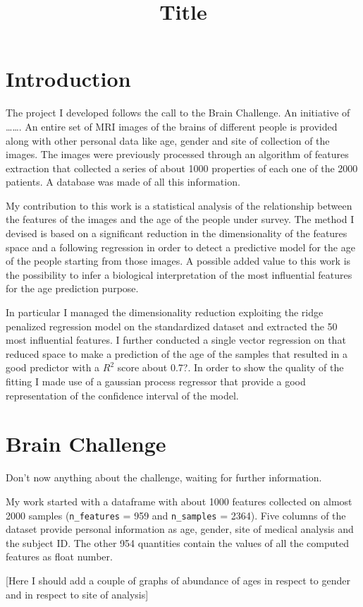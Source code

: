 \documentclass[11pt,a4paper]{report}
\begin{document}
\title{Title}

\section*{Introduction}
The project I developed follows the call to the Brain Challenge. An initiative of \dots \dots.
An entire set of MRI images of the brains of different people is provided along with other personal data like age, gender and site of collection of the images. The images were previously processed through an algorithm of features extraction that collected a series of about 1000 properties of each one of the 2000 patients. A database was made of all this information.

My contribution to this work is a statistical analysis of the relationship between the features of the images and the age of the people under survey. The method I devised is based on a significant reduction in the dimensionality of the features space and a following regression in order to detect a predictive model for the age of the people starting from those images. A possible added value to this work is the possibility to infer a biological interpretation of the most influential features for the age prediction purpose.

In particular I managed the dimensionality reduction exploiting the ridge penalized regression model on the standardized dataset and extracted the 50 most influential features. I further conducted a single vector regression on that reduced space to make a prediction of the age of the samples that resulted in a good predictor with a $R^{2}$ score about 0.7?. In order to show the quality of the fitting I made use of a gaussian process regressor that provide a good representation of the confidence interval of the model.


\section*{Brain Challenge}
Don't now anything about the challenge, waiting for further information.

My work started with a dataframe with about 1000 features collected on almost 2000 samples  (\texttt{n\_features} = 959 and \texttt{n\_samples} = 2364). Five columns of the dataset provide personal information as age, gender, site of medical analysis and the subject ID. The other 954 quantities contain the values of all the computed features as float number.

[Here I should add a couple of graphs of abundance of ages in respect to gender and in respect to site of analysis]
\end{document}
